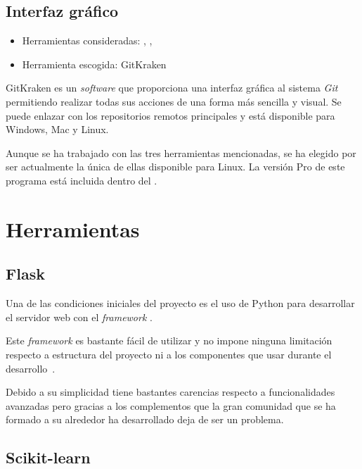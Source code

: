 \subsection{Interfaz gráfico}

\begin{itemize}
	\tightlist
	\item Herramientas consideradas:
	,
	,
	\item Herramienta escogida: GitKraken
\end{itemize}

GitKraken es un \textit{software} que proporciona una interfaz gráfica al
sistema \textit{Git} permitiendo realizar todas sus acciones de una forma más
sencilla y visual. Se puede enlazar con los repositorios remotos principales y
está disponible para Windows, Mac y Linux.

Aunque se ha trabajado con las tres herramientas mencionadas, se ha elegido por
ser actualmente la única de ellas disponible para Linux. La versión Pro de este programa está incluida dentro del .

\section{Herramientas}

\subsection{Flask}

Una de las condiciones iniciales del proyecto es el uso de Python para desarrollar el servidor web con el \textit{framework} .

Este \textit{framework} es bastante fácil de utilizar y no impone ninguna limitación respecto a estructura del proyecto ni a los componentes que usar durante el desarrollo~\cite{grinberg2014flask}.

Debido a su simplicidad tiene bastantes carencias respecto a funcionalidades avanzadas pero gracias a los complementos que la gran comunidad que se ha formado a su alrededor ha desarrollado deja de ser un problema.

\subsection{Scikit-learn}

